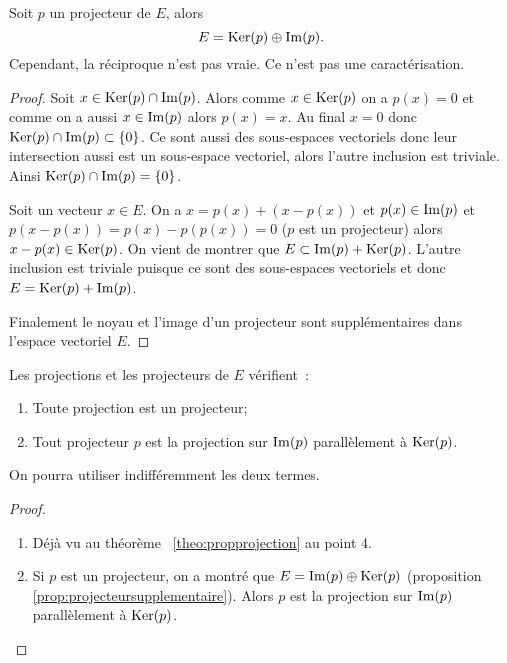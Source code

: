 \begin{prop}\label{prop:projecteursupplementaire}
  Soit \(p\) un projecteur de \(E\), alors
  \begin{equation}
    E = \operatorname{Ker}(p) \oplus \operatorname{Im}(p).
  \end{equation}
  Cependant, la réciproque n'est pas vraie. Ce n'est pas une caractérisation.
\end{prop}
\begin{proof}
  Soit \(x \in \operatorname{Ker}(p) \cap \operatorname{Im}(p)\). Alors comme \(x \in \operatorname{Ker}(p)\) on a \(p(x)=0\) et comme on a aussi \(x \in \operatorname{Im}(p)\) alors \(p(x)=x\). Au final \(x = 0\) donc \(\operatorname{Ker}(p) \cap \operatorname{Im}(p) \subset \{0\}\). Ce sont aussi des sous-espaces vectoriels donc leur intersection aussi est un sous-espace vectoriel, alors l'autre inclusion est triviale. Ainsi \(\operatorname{Ker}(p) \cap \operatorname{Im}(p)=\{0\}\).

  Soit un vecteur \(x \in E\). On a \(x = p(x) +(x-p(x))\) et \(p(x) \in \operatorname{Im}(p)\) et \(p(x-p(x))=p(x)-p(p(x))=0\) (\(p\) est un projecteur) alors \(x-p(x) \in \operatorname{Ker}(p)\). On vient de montrer que \(E \subset \operatorname{Im}(p) + \operatorname{Ker}(p)\). L'autre inclusion est triviale puisque ce sont des sous-espaces vectoriels et donc \(E = \operatorname{Ker}(p) +\operatorname{Im}(p)\).

  Finalement le noyau et l'image d'un projecteur sont supplémentaires dans l'espace vectoriel \(E\).
\end{proof}

\begin{prop}
Les projections et les projecteurs de \(E\) vérifient~:
  \begin{enumerate}
  \item Toute projection est un projecteur;
  \item Tout projecteur \(p\) est la projection sur \(\operatorname{Im}(p)\) parallèlement à \(\operatorname{Ker}(p)\).
  \end{enumerate}
  On pourra utiliser indifféremment les deux termes.
\end{prop}
\begin{proof}
  \begin{enumerate}
  \item Déjà vu au théorème~
\ref{theo:propprojection} au point 4.
  \item Si \(p\) est un projecteur, on a montré que \(E = \operatorname{Im}(p) \oplus \operatorname{Ker}(p)\) (proposition~
\ref{prop:projecteursupplementaire}). Alors \(p\) est la projection sur \(\operatorname{Im}(p)\) parallèlement à \(\operatorname{Ker}(p)\).
  \end{enumerate}
\end{proof}

